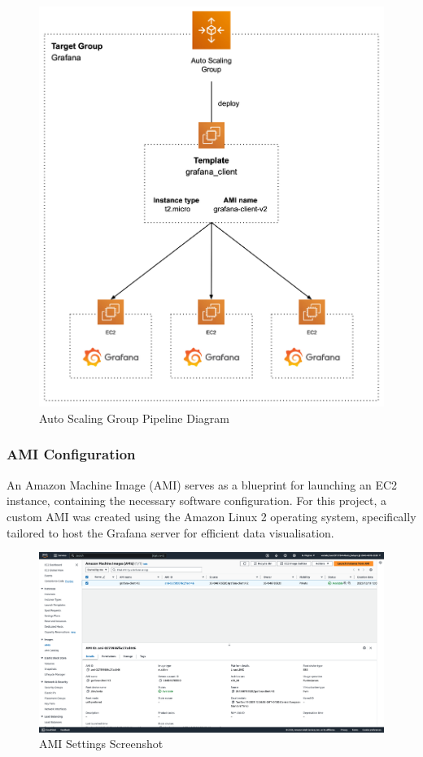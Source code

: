 \documentclass[12pt,oneside]{book} %
\begin{document}
\begin{figure}[H]
    \centering
    \includegraphics[width=1\linewidth]{images/grafana.png}
    \caption{Auto Scaling Group Pipeline Diagram}\label{fig:auto-scaling-group-pipeline}
\end{figure}

\newpage
\subsubsection{AMI Configuration}
An Amazon Machine Image (AMI) serves as a blueprint for launching an EC2
instance, containing the necessary software configuration. For this project, a
custom AMI was created using the Amazon Linux 2 operating system, specifically
tailored to host the Grafana server for efficient data visualisation.

\begin{figure}[H]
    \centering
    \includegraphics[width=1\linewidth]{images/ami.png}
    \caption{AMI Settings Screenshot}\label{fig:ami-settings}
\end{figure}
\end{document}
